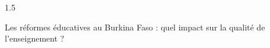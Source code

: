 \documentclass[12pt]{article}
\begin{document}
\begin{spacing}{1.5}

Les réformes éducatives au Burkina Faso : quel impact sur la qualité de l'enseignement ?


\quad
\quad

\end{spacing}
\end{document}
